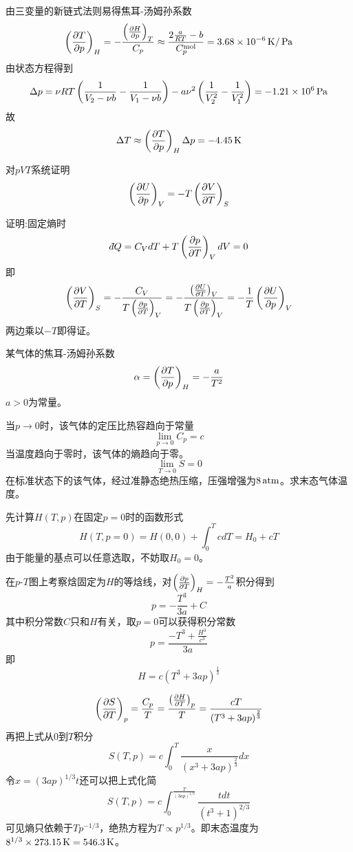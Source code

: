 \documentclass[CJK]{beamer}
\begin{document}
\begin{frame}
  \bch
  {\small
  由三变量的新链式法则易得焦耳-汤姆孙系数
        $$\left(\frac{\partial T}{\partial p}\right)_{H} = -\frac{\left(\frac{\partial H}{\partial p}\right)_{T}}{C_p} \approx \frac{2\frac{a}{RT}-b}{C_p^{\rm mol}} =  3.68\times 10^{-6}\,\mathrm{K}/\,\mathrm{Pa}$$
        由状态方程得到
        $$\Delta p = \nu RT\left(\frac{1}{V_2-\nu b}-\frac{1}{V_1-\nu b}\right) -a\nu^2\left(\frac{1}{V_2^2}-\frac{1}{V_1^2}\right)= -1.21\times 10^6\,\mathrm{Pa}$$
        故
        $$\Delta T \approx \left(\frac{\partial T}{\partial p}\right)_{H} \Delta p = -4.45\,\mathrm{K}$$
  }
  \ech
\end{frame}


\begin{frame}
  \bch
  对$pVT$系统证明
  $$\left(\frac{\partial U}{\partial p}\right)_{V} = -T\left(\frac{\partial V}{\partial T}\right)_{S}$$
  \ech
\end{frame}


\begin{frame}
  \bch
  证明:固定熵时
  $$ \dbar Q = C_V dT + T \pfrac pTV dV = 0 $$
  即
  $$ \left(\frac{\partial V}{\partial T}\right)_{S} = -\frac{C_V}{T\left(\frac{\partial p}{\partial T}\right)_{V}} = -\frac{\left(\frac{\partial U}{\partial T}\right)_{V}}{T\left(\frac{\partial p}{\partial T}\right)_{V}} = -\frac{1}{T} \left(\frac{\partial U}{\partial p}\right)_{V} $$
  两边乘以$-T$即得证。
  \ech
\end{frame}


\begin{frame}
  \chtitle{\proid (\sfour)}
  \bch
  {\small
  某气体的焦耳-汤姆孙系数
  $$\alpha = \left(\frac{\partial T}{\partial p}\right)_{H} =-\frac{a}{T^2}$$
  $a>0$为常量。

  当$p\rightarrow 0$时，该气体的定压比热容趋向于常量
  $$\lim_{p\rightarrow 0}C_p = c$$
  当温度趋向于零时，该气体的熵趋向于零。
  $$ \lim_{T\rightarrow 0} S = 0$$
  在标准状态下的该气体，经过准静态绝热压缩，压强增强为$8\,\mathrm{atm}$。求末态气体温度。
  }
  \ech
\end{frame}

\begin{frame}
  \bch
  {\small
    先计算$H(T, p)$在固定$p=0$时的函数形式
    $$H(T, p=0) = H(0, 0)+\int_0^T c dT = H_0+cT$$
    由于能量的基点可以任意选取，不妨取$H_0=0$。
  
    在$p$-$T$图上考察焓固定为$H$的等焓线，对$\left(\frac{\partial p}{\partial T}\right)_{H} = -\frac{T^2}{a}$积分得到
    $$ p = -\frac{T^3}{3a} + C $$
    其中积分常数$C$只和$H$有关，取$p=0$可以获得积分常数
    $$ p = \frac{-T^3 + \frac{H^3}{c^3}}{3a} $$
    即
    $$H = c\left(T^3 + 3ap\right)^{\frac{1}{3}} $$
  }
  \ech
\end{frame}

\begin{frame}
  \bch
  {\small
    $$ \left(\frac{\partial S}{\partial T}\right)_{p} = \frac{C_p}{T}= \frac{\left(\frac{\partial H}{\partial T}\right)_{p}}{T}  = \frac{cT}{\left(T^3 +3ap \right)^{\frac{2}{3}}} $$
    再把上式从$0$到$T$积分
    $$ S(T, p) = c \int_0^T  \frac{x}{\left(x^3 +3ap \right)^{\frac{2}{3}}} dx$$
    令$x = (3ap)^{1/3}t$还可以把上式化简
    $$S(T, p) = c \int_0^{\frac{T}{(3ap)^{1/3}}} \frac{tdt}{\left(t^3+1\right)^{2/3}} $$
    可见熵只依赖于$Tp^{-1/3}$，绝热方程为$T\propto p^{1/3}$。即末态温度为$8^{1/3}\times 273.15\,\mathrm{K} = 546.3\,\mathrm{K}$。
}
  \ech
\end{frame}
\end{document}
